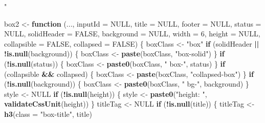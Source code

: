 \documentclass[]{book}
\newenvironment{Shaded}{\begin{snugshade}}{\end{snugshade}}
\newcommand{\ControlFlowTok}[1]{\textcolor[rgb]{0.13,0.29,0.53}{\textbf{#1}}}
\newcommand{\DataTypeTok}[1]{\textcolor[rgb]{0.13,0.29,0.53}{#1}}
\newcommand{\DecValTok}[1]{\textcolor[rgb]{0.00,0.00,0.81}{#1}}
\newcommand{\KeywordTok}[1]{\textcolor[rgb]{0.13,0.29,0.53}{\textbf{#1}}}
\newcommand{\NormalTok}[1]{#1}
\newcommand{\OperatorTok}[1]{\textcolor[rgb]{0.81,0.36,0.00}{\textbf{#1}}}
\newcommand{\OtherTok}[1]{\textcolor[rgb]{0.56,0.35,0.01}{#1}}
\newcommand{\StringTok}[1]{\textcolor[rgb]{0.31,0.60,0.02}{#1}}
\begin{document}
\begin{Shaded}
\begin{Highlighting}[]
\StringTok{"%

\NormalTok{box2 <-}\StringTok{ }\ControlFlowTok{function}\NormalTok{ (..., }\DataTypeTok{inputId =} \OtherTok{NULL}\NormalTok{, }\DataTypeTok{title =} \OtherTok{NULL}\NormalTok{, }\DataTypeTok{footer =} \OtherTok{NULL}\NormalTok{, }\DataTypeTok{status =} \OtherTok{NULL}\NormalTok{, }\DataTypeTok{solidHeader =} \OtherTok{FALSE}\NormalTok{, }
                 \DataTypeTok{background =} \OtherTok{NULL}\NormalTok{, }\DataTypeTok{width =} \DecValTok{6}\NormalTok{, }\DataTypeTok{height =} \OtherTok{NULL}\NormalTok{, }\DataTypeTok{collapsible =} \OtherTok{FALSE}\NormalTok{, }
                 \DataTypeTok{collapsed =} \OtherTok{FALSE}\NormalTok{) }
\NormalTok{\{}
\NormalTok{  boxClass <-}\StringTok{ "box"}
  \ControlFlowTok{if}\NormalTok{ (solidHeader }\OperatorTok{||}\StringTok{ }\OperatorTok{!}\KeywordTok{is.null}\NormalTok{(background)) \{}
\NormalTok{    boxClass <-}\StringTok{ }\KeywordTok{paste}\NormalTok{(boxClass, }\StringTok{"box-solid"}\NormalTok{)}
\NormalTok{  \}}
  \ControlFlowTok{if}\NormalTok{ (}\OperatorTok{!}\KeywordTok{is.null}\NormalTok{(status)) \{}
\NormalTok{    boxClass <-}\StringTok{ }\KeywordTok{paste0}\NormalTok{(boxClass, }\StringTok{" box-"}\NormalTok{, status)}
\NormalTok{  \}}
  \ControlFlowTok{if}\NormalTok{ (collapsible }\OperatorTok{&&}\StringTok{ }\NormalTok{collapsed) \{}
\NormalTok{    boxClass <-}\StringTok{ }\KeywordTok{paste}\NormalTok{(boxClass, }\StringTok{"collapsed-box"}\NormalTok{)}
\NormalTok{  \}}
  \ControlFlowTok{if}\NormalTok{ (}\OperatorTok{!}\KeywordTok{is.null}\NormalTok{(background)) \{}
\NormalTok{    boxClass <-}\StringTok{ }\KeywordTok{paste0}\NormalTok{(boxClass, }\StringTok{" bg-"}\NormalTok{, background)}
\NormalTok{  \}}
\NormalTok{  style <-}\StringTok{ }\OtherTok{NULL}
  \ControlFlowTok{if}\NormalTok{ (}\OperatorTok{!}\KeywordTok{is.null}\NormalTok{(height)) \{}
\NormalTok{    style <-}\StringTok{ }\KeywordTok{paste0}\NormalTok{(}\StringTok{"height: "}\NormalTok{, }\KeywordTok{validateCssUnit}\NormalTok{(height))}
\NormalTok{  \}}
\NormalTok{  titleTag <-}\StringTok{ }\OtherTok{NULL}
  \ControlFlowTok{if}\NormalTok{ (}\OperatorTok{!}\KeywordTok{is.null}\NormalTok{(title)) \{}
\NormalTok{    titleTag <-}\StringTok{ }\KeywordTok{h3}\NormalTok{(}\DataTypeTok{class =} \StringTok{"box-title"}\NormalTok{, title)}
}
\end{Highlighting}
\end{Shaded}
\end{document}
